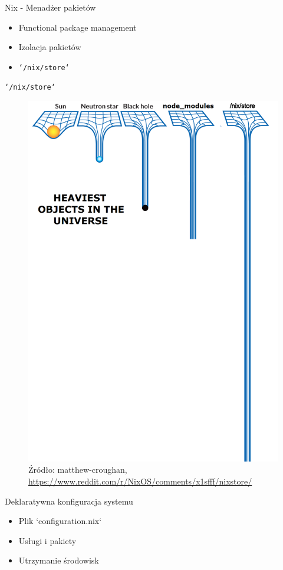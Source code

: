 \documentclass{beamer}
\begin{document}
\begin{frame}{Nix - Menadżer pakietów}
    \begin{itemize}
        \item Functional package management
        \item Izolacja pakietów
        \item \texttt{`/nix/store`}
    \end{itemize}
\end{frame}

\begin{frame}{\texttt{`/nix/store`}}
    \begin{figure}
        \caption*{\tiny Źródło: matthew-croughan, \url{https://www.reddit.com/r/NixOS/comments/x1sfff/nixstore/}}
        \includegraphics[width=0.5\linewidth]{./assets/nix-store.png}
    \end{figure}
\end{frame}

\begin{frame}{Deklaratywna konfiguracja systemu}
    \begin{itemize}
        \item Plik `configuration.nix`
        \item Usługi i pakiety
        \item Utrzymanie środowisk
    \end{itemize}
\end{frame}
\end{document}
